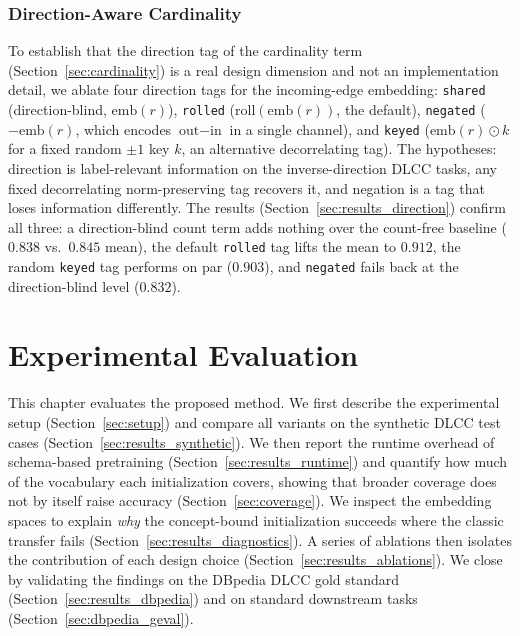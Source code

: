 \documentclass[a4paper,oneside,bibliography=totoc]{scrbook}
\begin{document}
\subsection{Direction-Aware Cardinality}
\label{sec:abl_direction}

To establish that the direction tag of the cardinality term
(Section~\ref{sec:cardinality}) is a real design dimension and not an
implementation detail, we ablate four direction tags for the incoming-edge
embedding: \texttt{shared} (direction-blind, $\mathrm{emb}(r)$), \texttt{rolled}
($\mathrm{roll}(\mathrm{emb}(r))$, the default), \texttt{negated}
($-\mathrm{emb}(r)$, which encodes $\text{out} - \text{in}$ in a single
channel), and \texttt{keyed} ($\mathrm{emb}(r) \odot k$ for a fixed random
$\pm 1$ key $k$, an alternative decorrelating tag). The hypotheses: direction is
label-relevant information on the inverse-direction DLCC tasks, any fixed
decorrelating norm-preserving tag recovers it, and negation is a tag that loses
information differently. The results (Section~\ref{sec:results_direction})
confirm all three: a direction-blind count term adds nothing over the count-free
baseline ($0.838$ vs.\ $0.845$ mean), the default \texttt{rolled} tag lifts the
mean to $0.912$, the random \texttt{keyed} tag performs on par ($0.903$), and
\texttt{negated} fails back at the direction-blind level ($0.832$).

\chapter{Experimental Evaluation}
\label{ch:experiments}
\label{ch:results}

This chapter evaluates the proposed method. We first describe the experimental
setup (Section~\ref{sec:setup}) and compare all variants on the synthetic DLCC
test cases (Section~\ref{sec:results_synthetic}). We then report the runtime
overhead of schema-based pretraining (Section~\ref{sec:results_runtime}) and
quantify how much of the vocabulary each initialization covers, showing that
broader coverage does not by itself raise accuracy
(Section~\ref{sec:coverage}). We inspect the embedding spaces to explain
\emph{why} the concept-bound initialization succeeds where the classic transfer
fails (Section~\ref{sec:results_diagnostics}). A series of ablations then isolates
the contribution of each design choice (Section~\ref{sec:results_ablations}). We
close by validating the findings on the DBpedia DLCC gold standard
(Section~\ref{sec:results_dbpedia}) and on standard downstream tasks
(Section~\ref{sec:dbpedia_geval}).
\end{document}
